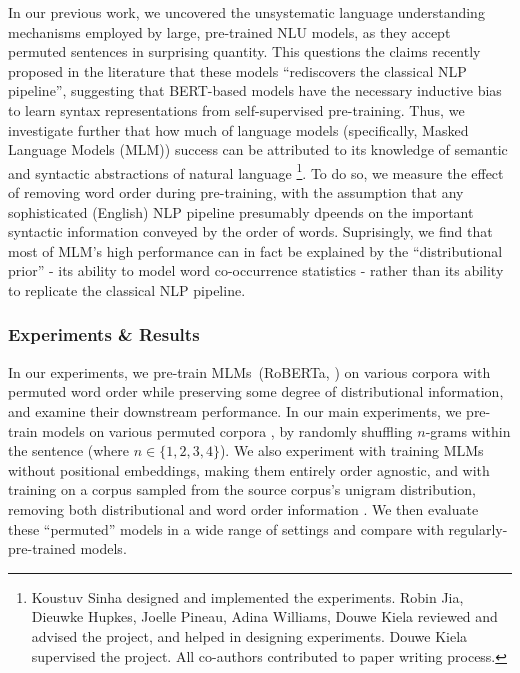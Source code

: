 \documentclass[12pt]{article}
\begin{document}
In our previous work, we uncovered the unsystematic language understanding mechanisms employed by large, pre-trained NLU models, as they accept permuted sentences in surprising quantity. This questions the claims recently proposed in the literature that these models ``rediscovers the classical NLP pipeline'', suggesting that BERT-based models have the necessary inductive bias to learn syntax representations from self-supervised pre-training. Thus, we investigate further that how much of language models (specifically, Masked Language Models (MLM)) success can be attributed to its knowledge of semantic and syntactic abstractions of natural language \cite{sinha2021a} \footnote{Koustuv Sinha designed and implemented the experiments. Robin Jia, Dieuwke Hupkes, Joelle Pineau, Adina Williams, Douwe Kiela reviewed and advised the project, and helped in designing experiments. Douwe Kiela supervised the project. All co-authors contributed to paper writing process. }. To do so, we measure the effect of removing word order during pre-training, with the assumption that any sophisticated (English) NLP pipeline presumably dpeends on the important syntactic information conveyed by the order of words. Suprisingly, we find that most of MLM's high performance can in fact be explained by the ``distributional prior'' - its ability to model word co-occurrence statistics - rather than its ability to replicate the classical NLP pipeline.


\subsubsection{Experiments \& Results}

In our experiments, we pre-train MLMs~(RoBERTa, \cite{liu2019b}) on various corpora with permuted word order while preserving some degree of distributional information, and examine their downstream performance.
In our main experiments, we pre-train models on various permuted corpora , by randomly shuffling $n$-grams within the sentence (where $n \in \{1,2,3,4\}$).
We also experiment with training MLMs without positional embeddings, making them entirely order agnostic,
and with training on a corpus sampled from the source corpus's %
unigram distribution, removing both distributional and word order information
. We then evaluate these ``permuted'' models in a wide range of settings and compare with regularly-pre-trained models.
\end{document}
